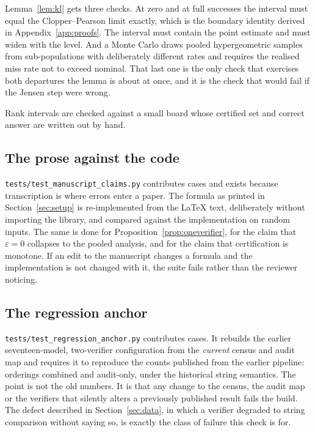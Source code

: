 Lemma~\ref{lem:kl} gets three checks. At zero and at full successes the interval must equal
the Clopper--Pearson limit exactly, which is the boundary identity derived in
Appendix~\ref{app:proofs}. The interval must contain the point estimate and must widen with
the level. And a Monte Carlo draws pooled hypergeometric samples from sub-populations with
deliberately different rates and requires the realised miss rate not to exceed nominal. That
last one is the only check that exercises both departures the lemma is about at once, and it
is the check that would fail if the Jensen step were wrong.

Rank intervals are checked against a small board whose certified set and correct answer are
written out by hand.

\subsection{The prose against the code}

\texttt{tests/test\_manuscript\_claims.py} contributes \TestsManuscriptClaims{} cases and
exists because transcription is where errors enter a paper. The formula as printed in
Section~\ref{sec:setup} is re-implemented from the LaTeX text, deliberately without importing
the library, and compared against the implementation on random inputs. The same is done for
Proposition~\ref{prop:oneverifier}, for the claim that $\varepsilon = 0$ collapses to the
pooled analysis, and for the claim that certification is monotone. If an edit to the
manuscript changes a formula and the implementation is not changed with it, the suite fails
rather than the reviewer noticing.

\subsection{The regression anchor}

\texttt{tests/test\_regression\_anchor.py} contributes \TestsAnchor{} cases. It rebuilds the
earlier seventeen-model, two-verifier configuration from the \emph{current} census and audit
map and requires it to reproduce the counts published from the earlier pipeline:
\AnchorStringCombined{} orderings combined and \AnchorStringAudit{} audit-only, under the
historical string semantics. The point is not the old numbers. It is that any change to the
census, the audit map or the verifiers that silently alters a previously published result
fails the build. The defect described in Section~\ref{sec:data}, in which a verifier degraded
to string comparison without saying so, is exactly the class of failure this check is for.

